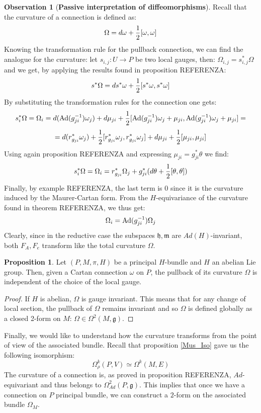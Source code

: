 \documentclass[12pt,a4paper]{report}
\theoremstyle{definition}
\theoremstyle{Theorem}
\newtheorem{Prop}[Def]{Proposition}
\theoremstyle{definition}
\theoremstyle{definition}
\newtheorem{Obs}[Def]{Observation}
\begin{document}
	\begin{Obs}[\textbf{Passive interpretation of diffeomorphisms}]
		Recall that the curvature of a connection is defined as:
		$$\Omega=d\omega+{1\over 2}[\omega,\omega]$$
		Knowing the transformation rule for the pullback connection, we can find the analogue for the curvature: let $s_{i,j}:U\rightarrow P$ be two local gauges, then: $\Omega_{i,j}=s_{i,j}^*\Omega$ and we get, by applying the results found in proposition REFERENZA:
		$$s^*\Omega=ds^*\omega+{1\over 2}[s^*\omega,s^*\omega]$$
		By substituting the transformation rules for the connection one gets:
		$$s_i^*\Omega=\Omega_i=d(\hbox{Ad}(g_{ji}^{-1})\omega_j)+d\mu_{ji}+{1\over 2}[\hbox{Ad}(g_{ji}^{-1})\omega_j+\mu_{ji},\hbox{Ad}(g_{ji}^{-1})\omega_j+\mu_{ji}]=$$
		$$=d(r^*_{g_{ji}}\omega_j)+{1\over 2}[r^*_{g_{ji}}\omega_j,r^*_{g_{ji}}\omega_j]+d\mu_{ji}+{1\over 2}[\mu_{ji},\mu_{ji}]$$
		Using again proposition REFERENZA and expressing $\mu_{ji}=g_{ji}^*\theta$ we find:
		$$s_i^*\Omega=\Omega_i=r^*_{g_{ji}}\Omega_j+g_{ji}^*(d\theta+{1\over 2}[\theta,\theta])$$
		Finally, by example REFERENZA, the last term is 0 since it is the curvature induced by the Maurer-Cartan form. From the $H$-equivariance of the curvature found in theorem REFERENZA, we thus get:
		$$\Omega_i=\hbox{Ad}(g_{ji}^{-1})\Omega_j$$
		Clearly, since in the reductive case the subspaces $\mathfrak{h},\mathfrak{m}$ are $Ad(H)$-invariant, both $F_A,F_e$ transform like the total curvature $\Omega$.
	\end{Obs}
	\begin{Prop}
		Let $(P,M,\pi,H)$ be a principal $H$-bundle and $H$ an abelian Lie group. Then, given a Cartan connection $\omega$ on $P$, the pullback of its curvature $\Omega$ is independent of the choice of the local gauge.
	\end{Prop}
	\begin{proof}
		If $H$ is abelian, $\Omega$ is gauge invariant. This means that for any change of local section, the pullback of $\Omega$ remains invariant and so $\Omega$ is defined globally as a closed 2-form on $M$: $\Omega\in \Omega^2(M,\mathfrak{g})$.
	\end{proof}
	Finally, we would like to understand how the curvature transforms from the point of view of the associated bundle. Recall that proposition \ref{Mus_Iso} gave us the following isomorphism:
	$$\Omega^k_\rho(P,V)\simeq \Omega^k(M,E)$$
	The curvature of a connection is, as proved in proposition REFERENZA, $Ad$-equivariant and thus belongs to $\Omega^2_{Ad}(P,\mathfrak{g})$. This implies that once we have a connection on $P$ principal bundle, we can construct a $2$-form on the associated bundle $\Omega_M$.
\end{document}
